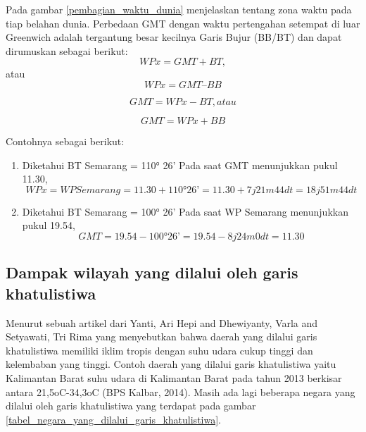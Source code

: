 Pada gambar \ref{pembagian_waktu_dunia} menjelaskan tentang zona waktu pada tiap belahan dunia. Perbedaan GMT dengan waktu pertengahan setempat di luar Greenwich adalah tergantung besar kecilnya Garis Bujur (BB/BT) dan dapat dirumuskan sebagai berikut\cite{khusurur2016mengenal}:
\begin{equation}
WP x = GMT + BT, 
\end{equation}
atau 
\begin{equation}
WP x = GMT – BB
\end{equation}

\begin{equation}
GMT = WP x - BT, 
atau
\end{equation}

\begin{equation}
GMT = WP x + BB
\end{equation}

Contohnya sebagai berikut:

\begin{enumerate}
\item
Diketahui BT Semarang = 110° 26’
Pada saat GMT menunjukkan pukul 11.30, 
\begin{equation}
WP x = WP Semarang = 11.30 + 110° 26’
= 11.30 + 7 j 21m 44dt
= 18 j 51 m 44 dt
\end{equation}

\item
Diketahui BT Semarang = 100° 26’
Pada saat WP Semarang menunjukkan pukul 19.54,
\begin{equation}
GMT = 19.54 - 100° 26’
    = 19.54 - 8 j 24m 0dt
    = 11.30
\end{equation}
\end{enumerate}



\subsection{Dampak wilayah yang dilalui oleh garis khatulistiwa}

	Menurut sebuah artikel dari Yanti, Ari Hepi and Dhewiyanty, Varla and Setyawati, Tri Rima yang menyebutkan bahwa daerah yang dilalui garis khatulistiwa 
memiliki iklim tropis dengan suhu udara cukup tinggi dan kelembaban yang tinggi. Contoh daerah yang dilalui garis khatulistiwa yaitu Kalimantan Barat suhu udara di Kalimantan Barat pada tahun 2013 berkisar antara 21,5oC-34,3oC (BPS Kalbar, 2014)\cite{yanti2015prevalensi}. Masih ada lagi beberapa negara yang dilalui oleh garis khatulistiwa yang terdapat pada gambar \ref{tabel_negara_yang_dilalui_garis_khatulistiwa}.


